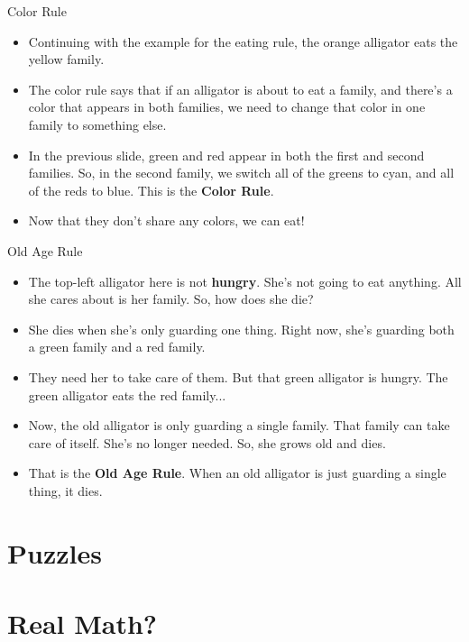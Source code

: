 \documentclass[usenames,dvipsnames]{beamer}
\newcommand{\pic}[2]{\texttt{[image: \#2]}}
\newcommand{\hungry}[0]{\textbf{hungry}}
\begin{document}
\begin{frame}{Color Rule}

  \begin{itemize}
    \item<1|only@1>
      Continuing with the example for the eating rule, the orange alligator eats the yellow
      family.

    \item<2|only@2>
      The color rule says that if an alligator is about to eat a family, and
      there's a color that appears in both families, we need to change that
      color in one family to something else.

    \item<3|only@3>
      In the previous slide, green and red appear in both the first and second
      families. So, in the second family, we switch all of the greens to cyan,
      and all of the reds to blue. This is the \textbf{Color Rule}.

    \item<4|only@4>
      Now that they don't share any colors, we can eat!

  \end{itemize}
\end{frame}

\begin{frame}{Old Age Rule}
  \begin{itemize}
    \item<1|only@1>
      The top-left alligator here is not \hungry. She's not going to eat
      anything. All she cares about is her family. So, how does she die?
    \item<1|only@1>
      She dies when she's only guarding one thing. Right now, she's guarding
      both a green family and a red family. 
      
    \item<2|only@2>
      They need her to take care of them. But that green alligator is hungry.
      The green alligator eats the red family...
      
    \item<3|only@3>
      Now, the old alligator is only guarding a single family. That family can
      take care of itself. She's no longer needed. So, she grows old and dies.
      
    \item<4|only@4>
      That is the \textbf{Old Age Rule}.
      When an old alligator is just guarding a single thing, it dies.
  \end{itemize}
\end{frame}

\section{Puzzles}

\section{Real Math?}
\end{document}
